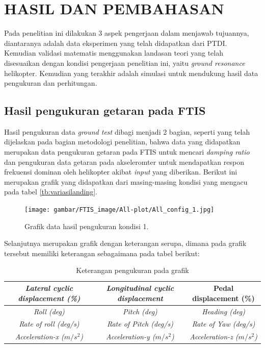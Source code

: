 \chapter{HASIL DAN PEMBAHASAN}
\label{chap:hasil dan pembahasan}


Pada penelitian ini dilakukan 3 aspek pengerjaan dalam menjawab tujuannya, diantaranya adalah data eksperimen yang telah didapatkan dari PTDI. Kemudian validasi matematis menggunakan landasan teori yang telah disesuaikan dengan kondisi pengerjaan penelitian ini, yaitu \textit{ground resonance} helikopter. Kemudian yang terakhir adalah simulasi untuk mendukung hasil data pengukuran dan perhitungan. 

\section{Hasil pengukuran getaran pada FTIS}

Hasil pengukuran data \textit{ground test} dibagi menjadi 2 bagian, seperti yang telah dijelaskan pada bagian metodologi penelitian, bahwa data yang didapatkan merupakan data pengukuran getaran pada FTIS untuk mencari \textit{damping ratio} dan pengukuran data getaran pada akseleromter untuk mendapatkan respon frekuensi dominan oleh helikopter akibat \textit{input} yang diberikan. Berikut ini merupakan grafik yang didapatkan dari masing-masing kondisi yang mengacu pada tabel \ref{tb:variasilanding}.

\begin{figure}[H]
	\centering
	\texttt{[image: gambar/FTIS\_image/All-plot/All\_config\_1.jpg]}
	\caption{Grafik data hasil pengukuran kondisi 1.}
	\label{fig:condition_1}
\end{figure}

Selanjutnya merupakan grafik dengan keterangan serupa, dimana pada grafik tersebut memiliki keterangan sebagaimana pada tabel berikut:

\begin{table}[]
	\caption{Keterangan pengukuran pada grafik}
	\begin{tabular}{|c|c|c|}
		\hline
		\textit{Lateral cyclic displacement (\%)} & \textit{Longitudinal cyclic displacement} & Pedal displacement (\%)           \\ \hline
		\textit{Roll (deg)}                       & \textit{Pitch (deg)}                      & \textit{Heading (deg)}            \\ \hline
		\textit{Rate of roll (deg/s)}             & \textit{Rate of Pitch (deg/s)}            & \textit{Rate of Yaw (deg/s)}      \\ \hline
		\textit{Acceleration-x ($m/s^2$)}         & \textit{Acceleration-y ($m/s^2$)}         & \textit{Acceleration-z ($m/s^2$)} \\ \hline
	\end{tabular}
\end{table}

